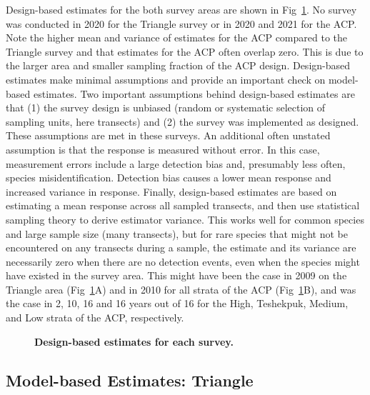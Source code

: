 \documentclass[
  10pt,
  letterpaper,
]{article}
\begin{document}
Design-based estimates for the both survey areas are shown in
Fig~\ref{fig-design}. No survey was conducted in 2020 for the Triangle
survey or in 2020 and 2021 for the ACP. Note the higher mean and
variance of estimates for the ACP compared to the Triangle survey and
that estimates for the ACP often overlap zero. This is due to the larger
area and smaller sampling fraction of the ACP design. Design-based
estimates make minimal assumptions and provide an important check on
model-based estimates. Two important assumptions behind design-based
estimates are that (1) the survey design is unbiased (random or
systematic selection of sampling units, here transects) and (2) the
survey was implemented as designed. These assumptions are met in these
surveys. An additional often unstated assumption is that the response is
measured without error. In this case, measurement errors include a large
detection bias and, presumably less often, species misidentification.
Detection bias causes a lower mean response and increased variance in
response. Finally, design-based estimates are based on estimating a mean
response across all sampled transects, and then use statistical sampling
theory to derive estimator variance. This works well for common species
and large sample size (many transects), but for rare species that might
not be encountered on any transects during a sample, the estimate and
its variance are necessarily zero when there are no detection events,
even when the species might have existed in the survey area. This might
have been the case in 2009 on the Triangle area (Fig~\ref{fig-design}A) and in 2010 for all strata of the ACP (Fig~\ref{fig-design}B), and
was the case in 2, 10, 16 and 16 years out of 16 for the High,
Teshekpuk, Medium, and Low strata of the ACP, respectively.

\begin{figure}

\caption{\label{fig-design}\textbf{Design-based estimates for each survey.}}

\end{figure}%

\subsection{Model-based Estimates:
Triangle}\label{model-based-estimates-triangle}
\end{document}
